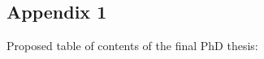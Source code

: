 \documentclass{article}
\begin{document}


\clearpage


\cleardoublepage
\appendix
\begin{center}
\section*{\LARGE Appendix 1}
\end{center}
Proposed table of contents of the final PhD thesis:
\end{document}
